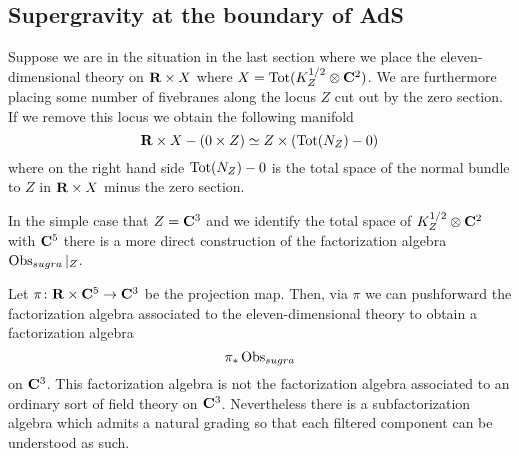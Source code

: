 \documentclass[11pt]{amsart}
\begin{document}
\subsection{Supergravity at the boundary of AdS}

Suppose we are in the situation in the last section where we place the eleven-dimensional theory on $\mathbf{R} \times X$ where $X = {\rm Tot}(K^{1/2}_Z \otimes \mathbf{C}^2)$. 
We are furthermore placing some number of fivebranes along the locus $Z$ cut out by the zero section. 
If we remove this locus we obtain the following manifold 
\[
\mathbf{R} \times X - \left(0 \times Z\right) \simeq Z \times \left({\rm Tot}(N_Z) - 0\right) 
\]
where on the right hand side ${\rm Tot}(N_Z) - 0$ is the total space of the normal bundle to $Z$ in $\mathbf{R} \times X$ minus the zero section.

\parsec[s:flat]

%

In the simple case that $Z = \mathbf{C}^3$ and we identify the total space of $K^{1/2}_Z \otimes \mathbf{C}^2$ with $\mathbf{C}^5$ there is a more direct construction of the factorization algebra $\operatorname{Obs}_{sugra}|_{Z}$. 

Let $\pi \colon \mathbf{R} \times \mathbf{C}^5 \to \mathbf{C}^3$ be the projection map.
Then, via $\pi$ we can pushforward the factorization algebra associated to the eleven-dimensional theory to obtain a factorization algebra
\[
\pi_* \operatorname{Obs}_{sugra} 
\]
on $\mathbf{C}^3$.
This factorization algebra is not the factorization algebra associated to an ordinary sort of field theory on $\mathbf{C}^3$. 
Nevertheless there is a subfactorization algebra which admits a natural grading so that each filtered component can be understood as such.
\end{document}
